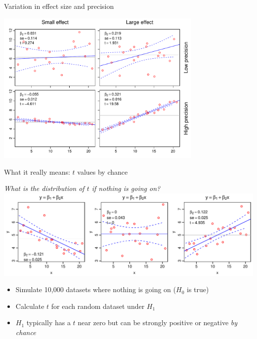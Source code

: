\documentclass[xcolor=x11names,handout,compress]{beamer}
\renewcommand{\(}{\begin{columns}}
\renewcommand{\)}{\end{columns}}
\newcommand{\<}[1]{\begin{column}{#1}}
\renewcommand{\>}{\end{column}}
\begin{document}
\begin{frame}{Variation in effect size and precision}
	
\centerline{\includegraphics[height=75mm]{T_examples.pdf}}

\end{frame}

\begin{frame}{What it really means: $t$ values by chance}

\begin{center}
    \it What is the distribution of $t$ if nothing is going on?\\
    \pause
    \includegraphics[width=\textwidth]{t_extremes.pdf}
\end{center}

\pause
\begin{itemize}[<+->]\itemsep6pt
\item Simulate 10,000 datasets where nothing is going on ($H_0$ is true)
\item Calculate $t$ for each random dataset under $H_1$
\item $H_1$ typically has a $t$ near zero but can be strongly positive or negative {\it by chance}
\end{itemize}

\end{frame}
\end{document}

